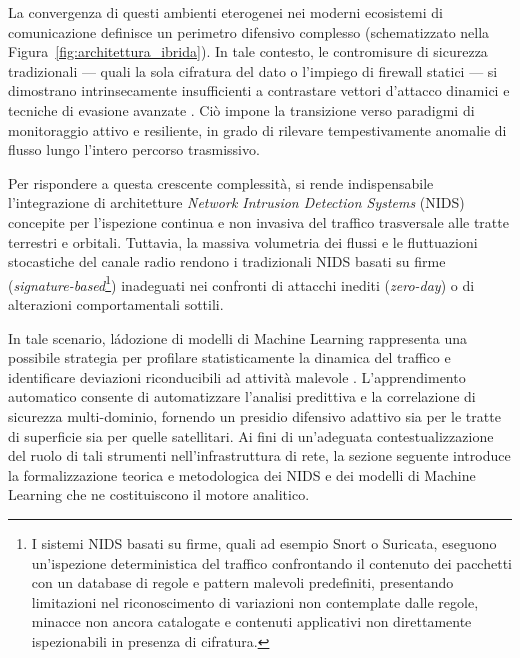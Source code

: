 La convergenza di questi ambienti eterogenei nei moderni ecosistemi di comunicazione definisce un perimetro difensivo complesso (schematizzato nella Figura~\ref{fig:architettura_ibrida}). 
In tale contesto, le contromisure di sicurezza tradizionali — quali la sola cifratura del dato o l'impiego di firewall statici — si dimostrano intrinsecamente insufficienti a contrastare vettori d'attacco dinamici e tecniche di evasione avanzate \cite{stallings2020}. 
Ciò impone la transizione verso paradigmi di monitoraggio attivo e resiliente, in grado di rilevare tempestivamente anomalie di flusso lungo l'intero percorso trasmissivo.

Per rispondere a questa crescente complessità, si rende indispensabile l'integrazione di architetture \textit{Network Intrusion Detection Systems} (NIDS) concepite per l'ispezione continua e non invasiva del traffico trasversale alle tratte terrestri e orbitali. 
Tuttavia, la massiva volumetria dei flussi e le fluttuazioni stocastiche del canale radio rendono i tradizionali NIDS basati su firme (\textit{signature-based}\footnote{I sistemi NIDS basati su firme, quali ad esempio Snort o Suricata, eseguono un'ispezione deterministica del traffico confrontando il contenuto dei pacchetti con un database di regole e pattern malevoli predefiniti, presentando limitazioni nel riconoscimento di variazioni non contemplate dalle regole, minacce non ancora catalogate e contenuti applicativi non direttamente ispezionabili in presenza di cifratura.}) inadeguati nei confronti di attacchi inediti (\textit{zero-day}) o di alterazioni comportamentali sottili.

In tale scenario, l\'adozione di modelli di Machine Learning rappresenta una possibile strategia per profilare statisticamente la dinamica del traffico e identificare deviazioni riconducibili ad attività malevole \cite{khraisat2019}.
L'apprendimento automatico consente di automatizzare l'analisi predittiva e la correlazione di sicurezza multi-dominio, fornendo un presidio difensivo adattivo sia per le tratte di superficie sia per quelle satellitari. 
Ai fini di un'adeguata contestualizzazione del ruolo di tali strumenti nell'infrastruttura di rete, la sezione seguente introduce la formalizzazione teorica e metodologica dei NIDS e dei modelli di Machine Learning che ne costituiscono il motore analitico.

